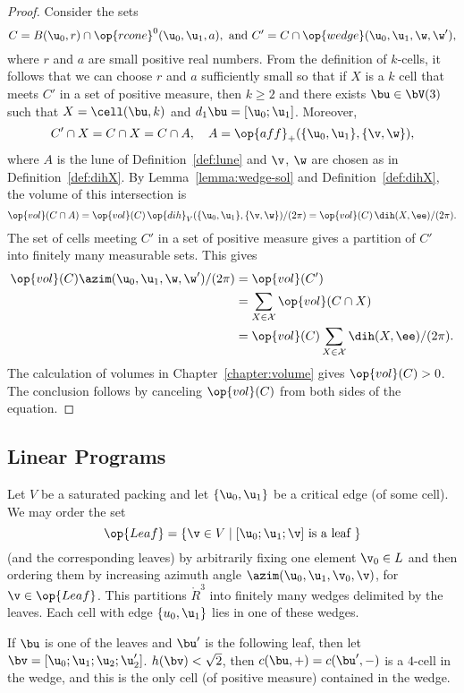 \begin{proof} 
  Consider the sets
\[
C=B(\u_0,r)\cap \op{rcone}^0(\u_0,\u_1,a),\text{ and } C' = C\cap \op{wedge}(\u_0,\u_1,\w,\w') ,
\]
 where
  $r$ and $a$ are small positive real numbers.  From the definition of
  $k$-cells, it follows that we can choose $r$ and $a$ sufficiently
  small so that if $X$ is a $k$ cell that meets $C'$ in a set of
  positive measure, then $k\ge 2$ and there exists $\bu\in \bV(3)$
  such that $X=\cell(\bu,k)$ and $d_1\bu=[\u_0;\u_1]$.  Moreover,
\[
C'\cap X = C\cap X = C\cap A, \quad A=\op{aff}_+(\{\u_0,\u_1\},\{\v,\w\}),
\]
where $A$ is the lune of Definition~\ref{def:lune} and $\v$, $\w$ are
chosen as in Definition~\ref{def:dihX}.  By
Lemma~\ref{lemma:wedge-sol} and Definition~\ref{def:dihX}, the volume
of this intersection is
\[
\op{vol}(C\cap A) = \op{vol}(C)\,
 {\op{dih}_V(\{\u_0,\u_1\},\{\v,\w\}) }/{(2\pi)} =
  \op{vol}(C)\, {\dih(X,\ee)}/{(2\pi)}.
\]
The set of cells meeting $C'$ in a set of positive measure gives a 
partition of $C'$ into finitely many measurable sets.
This gives
\begin{align*}
\op{vol}(C) \azim(\u_0,\u_1,\w,\w')/(2\pi) &= 
\op{vol}(C') \\
&= \sum_{X\in\cX} \op{vol}(C\cap X)  \\
&= \op{vol}(C)\sum_{X\in\cX} \dih(X,\ee)/(2\pi).
\end{align*}
The calculation of volumes in Chapter~\ref{chapter:volume} gives
$\op{vol}(C)>0$.  The conclusion follows by canceling $\op{vol}(C)$
from both sides of the equation.
\end{proof}


\subsection{Linear Programs}

Let $V$ be a saturated packing and let $\{\u_0,\u_1\}$ be a critical edge (of some cell).
We may order the set 
\[
\op{Leaf} = \{ \v\in V \mid [\u_0;\u_1;\v] \text{ is a leaf } \}
\]
(and the corresponding leaves)
by arbitrarily fixing one element $\v_0\in L$ and then ordering them by increasing
azimuth angle $\azim(\u_0,\u_1,\v_0,\v)$, for $\v\in \op{Leaf}$.  This partitions $\ring{R}^3$ into
finitely many wedges delimited by the leaves.  Each cell with edge $\{u_0,\u_1\}$ lies in one of these
wedges.    

If  $\bu$ is one of the leaves and $\bu'$ is the following leaf, then let $\bv = [\u_0;\u_1;\u_2;\u_2']$.
$h(\bv) < \sqrt2$, then $c(\bu,+)=c(\bu',-)$ is a $4$-cell in the wedge,
 and this is the only cell (of positive measure)
contained in the wedge.


